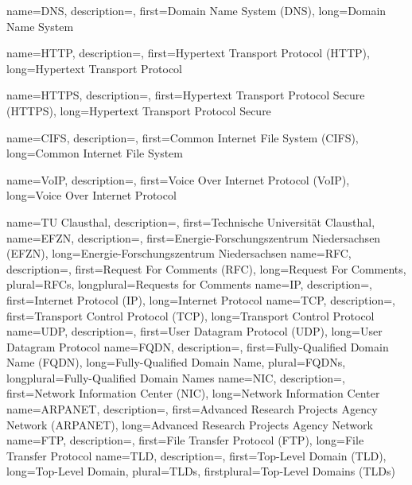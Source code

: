 {%
    name={DNS},
    description={},
    first={Domain Name System (DNS)},
    long={Domain Name System}
}

{%
    name={HTTP},
    description={},
    first={Hypertext Transport Protocol (HTTP)},
    long={Hypertext Transport Protocol}

}
{%
    name={HTTPS},
    description={},
    first={Hypertext Transport Protocol Secure (HTTPS)},
    long={Hypertext Transport Protocol Secure}

}
{%
    name={CIFS},
    description={},
    first={Common Internet File System (CIFS)},
    long={Common Internet File System}

}
{%
    name={VoIP},
    description={},
    first={Voice Over Internet Protocol (VoIP)},
    long={Voice Over Internet Protocol}

}
{%
    name={TU Clausthal},
    description={},
    first={Technische Universität Clausthal},
}
{%
    name={EFZN},
    description={},
    first={Energie-Forschungszentrum Niedersachsen (EFZN)},
    long={Energie-Forschungszentrum Niedersachsen}
}
{%
    name={RFC},
    description={},
    first={Request For Comments (RFC)},
    long={Request For Comments},
    plural={RFCs},
    longplural={Requests for Comments}
}
{%
    name={IP},
    description={},
    first={Internet Protocol (IP)},
    long={Internet Protocol}
}
{%
    name={TCP},
    description={},
    first={Transport Control Protocol (TCP)},
    long={Transport Control Protocol}
}
{%
    name={UDP},
    description={},
    first={User Datagram Protocol (UDP)},
    long={User Datagram Protocol}
}
{%
    name={FQDN},
    description={},
    first={Fully-Qualified Domain Name (FQDN)},
    long={Fully-Qualified Domain Name},
    plural={FQDNs},
    longplural={Fully-Qualified Domain Names}
}
{%
    name={NIC},
    description={},
    first={Network Information Center (NIC)},
    long={Network Information Center}
}
{%
    name={ARPANET},
    description={},
    first={Advanced Research Projects Agency Network (ARPANET)},
    long={Advanced Research Projects Agency Network}
}
{%
    name={FTP},
    description={},
    first={File Transfer Protocol (FTP)},
    long={File Transfer Protocol}
}
{%
    name={TLD},
    description={},
    first={Top-Level Domain (TLD)},
    long={Top-Level Domain},
    plural={TLDs},
    firstplural={Top-Level Domains (TLDs)}
}
